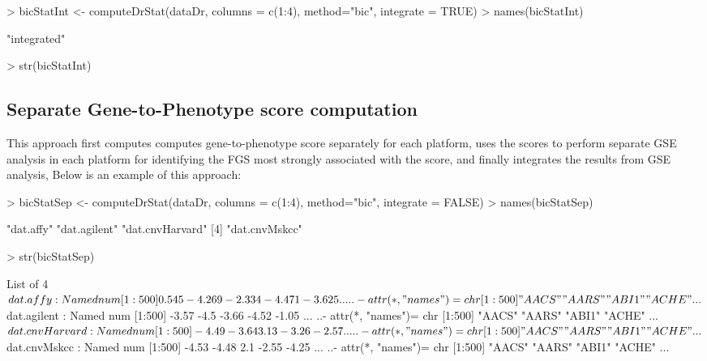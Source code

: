 \documentclass[11pt]{article}
\begin{document}
\begin{Schunk}
\begin{Sinput}
> bicStatInt <- computeDrStat(dataDr, columns = c(1:4), method="bic", integrate = TRUE)
> names(bicStatInt)
\end{Sinput}
\begin{Soutput}
[1] "integrated"
\end{Soutput}
\begin{Sinput}
> str(bicStatInt)
\end{Sinput}
\end{Schunk}


\subsection{Separate Gene-to-Phenotype score computation}
This approach first computes computes gene-to-phenotype score separately for each platform,
uses the scores to perform separate GSE analysis in each platform for identifying the FGS most 
strongly associated with the score, and finally integrates the results from GSE analysis,
Below is an example of this approach:

\begin{Schunk}
\begin{Sinput}
> bicStatSep <- computeDrStat(dataDr, columns = c(1:4), method="bic", integrate = FALSE)
> names(bicStatSep)
\end{Sinput}
\begin{Soutput}
[1] "dat.affy"       "dat.agilent"    "dat.cnvHarvard"
[4] "dat.cnvMskcc"  
\end{Soutput}
\begin{Sinput}
> str(bicStatSep)
\end{Sinput}
\begin{Soutput}
List of 4
 $ dat.affy      : Named num [1:500] 0.545 -4.269 -2.334 -4.471 -3.625 ...
  ..- attr(*, "names")= chr [1:500] "AACS" "AARS" "ABI1" "ACHE" ...
 $ dat.agilent   : Named num [1:500] -3.57 -4.5 -3.66 -4.52 -1.05 ...
  ..- attr(*, "names")= chr [1:500] "AACS" "AARS" "ABI1" "ACHE" ...
 $ dat.cnvHarvard: Named num [1:500] -4.49 -3.64 3.13 -3.26 -2.57 ...
  ..- attr(*, "names")= chr [1:500] "AACS" "AARS" "ABI1" "ACHE" ...
 $ dat.cnvMskcc  : Named num [1:500] -4.53 -4.48 2.1 -2.55 -4.25 ...
  ..- attr(*, "names")= chr [1:500] "AACS" "AARS" "ABI1" "ACHE" ...
\end{Soutput}
\end{Schunk}
\end{document}
